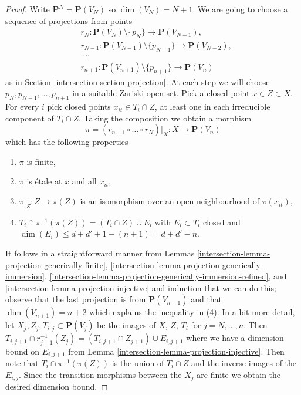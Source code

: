 \begin{proof}

Write $\mathbf{P}^N = \mathbf{P}(V_N)$ so $\dim(V_N) = N + 1$.
We are going to choose a sequence of projections from points
\begin{align*}
& r_N :
\mathbf{P}(V_N) \setminus \{p_N\} \to \mathbf{P}(V_{N - 1}), \\
& r_{N - 1} :
\mathbf{P}(V_{N - 1}) \setminus \{p_{N - 1}\} \to \mathbf{P}(V_{N - 2}), \\
& \ldots,\\
& r_{n + 1} :
\mathbf{P}(V_{n + 1}) \setminus \{p_{n + 1}\} \to \mathbf{P}(V_n)
\end{align*}
as in Section \ref{intersection-section-projection}. At each step we will choose
$p_N, p_{N - 1}, \ldots, p_{n + 1}$ in a suitable Zariski open set.
Pick a closed point $x \in Z \subset X$. For every $i$ pick
closed points $x_{it} \in T_i \cap Z$, at least one in each irreducible
component of $T_i \cap Z$. Taking the composition we obtain
a morphism
$$
\pi = (r_{n + 1} \circ \ldots \circ r_N)|_X :
X \longrightarrow \mathbf{P}(V_n)
$$
which has the following properties
\begin{enumerate}
\item $\pi$ is finite,
\item $\pi$ is \'etale at $x$ and all $x_{it}$,
\item $\pi|_Z : Z \to \pi(Z)$ is an isomorphism
over an open neighbourhood of $\pi(x_{it})$,
\item $T_i \cap \pi^{-1}(\pi(Z)) = (T_i \cap Z) \cup E_i$ with
$E_i \subset T_i$ closed and
$\dim(E_i) \leq d + d' + 1 - (n + 1) = d + d' - n$.
\end{enumerate}
It follows in a straightforward manner from
Lemmas \ref{intersection-lemma-projection-generically-finite},
\ref{intersection-lemma-projection-generically-immersion},
\ref{intersection-lemma-projection-generically-immersion-refined}, and
\ref{intersection-lemma-projection-injective} and induction that we can do this;
observe that the last projection is from $\mathbf{P}(V_{n + 1})$ and that
$\dim(V_{n + 1}) = n + 2$ which explains the inequality in (4). In a bit
more detail, let $X_j, Z_j, T_{i, j} \subset \mathbf{P}(V_j)$ be the images
of $X$, $Z$, $T_i$ for $j = N, \ldots, n$. Then
$T_{i, j + 1} \cap r_{j + 1}^{-1}(Z_j) = (T_{i, j + 1} \cap Z_{j + 1})
\cup E_{i, j + 1}$ where we have a dimension bound on $E_{i, j + 1}$
from Lemma \ref{intersection-lemma-projection-injective}. Then note that
$T_i \cap \pi^{-1}(\pi(Z))$ is the union of $T_i \cap Z$
and the inverse images of the $E_{i, j}$. Since the transition morphisms
between the $X_j$ are finite we obtain the desired dimension bound.


\end{proof}
